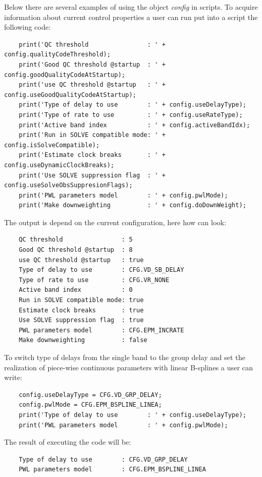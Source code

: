 \documentclass [10pt,letterpaper]{report}
\begin{document}
Below there are several examples of using the object {\sl config} in scripts. To acquire information
about current control properties a user can run put into a script the following code:
{\small\begin{verbatim}
    print('QC threshold                : ' + config.qualityCodeThreshold);
    print('Good QC threshold @startup  : ' + config.goodQualityCodeAtStartup);
    print('use QC threshold @startup   : ' + config.useGoodQualityCodeAtStartup);
    print('Type of delay to use        : ' + config.useDelayType);
    print('Type of rate to use         : ' + config.useRateType);
    print('Active band index           : ' + config.activeBandIdx);
    print('Run in SOLVE compatible mode: ' + config.isSolveCompatible);
    print('Estimate clock breaks       : ' + config.useDynamicClockBreaks);
    print('Use SOLVE suppression flag  : ' + config.useSolveObsSuppresionFlags);
    print('PWL parameters model        : ' + config.pwlMode);
    print('Make downweighting          : ' + config.doDownWeight);
\end{verbatim}}
\noindent
The output is depend on the current configuration, here how can look:
{\small\begin{verbatim}
    QC threshold                : 5
    Good QC threshold @startup  : 8
    use QC threshold @startup   : true
    Type of delay to use        : CFG.VD_SB_DELAY
    Type of rate to use         : CFG.VR_NONE
    Active band index           : 0
    Run in SOLVE compatible mode: true
    Estimate clock breaks       : true
    Use SOLVE suppression flag  : true
    PWL parameters model        : CFG.EPM_INCRATE
    Make downweighting          : false
\end{verbatim}}

To switch type of delays from the single band to the group delay and set
the realization of piece-wise continuous parameters with linear B-splines
a user can write:
{\small\begin{verbatim}
    config.useDelayType = CFG.VD_GRP_DELAY;
    config.pwlMode = CFG.EPM_BSPLINE_LINEA;
    print('Type of delay to use        : ' + config.useDelayType);
    print('PWL parameters model        : ' + config.pwlMode);
\end{verbatim}}
\noindent
The result of executing the code will be:
{\small\begin{verbatim}
    Type of delay to use        : CFG.VD_GRP_DELAY
    PWL parameters model        : CFG.EPM_BSPLINE_LINEA
\end{verbatim}}
\end{document}
